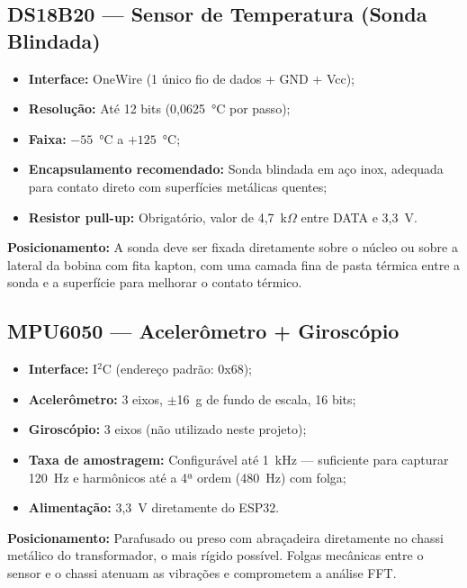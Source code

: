 \documentclass[12pt, a4paper]{article}
\begin{document}
\subsection{DS18B20 --- Sensor de Temperatura (Sonda Blindada)}

\begin{itemize}[leftmargin=2cm]
    \item \textbf{Interface:} OneWire (1 único fio de dados + GND + Vcc);
    \item \textbf{Resolução:} Até 12 bits (0,0625~°C por passo);
    \item \textbf{Faixa:} $-55$~°C a $+125$~°C;
    \item \textbf{Encapsulamento recomendado:} Sonda blindada em aço inox, adequada para contato direto com superfícies metálicas quentes;
    \item \textbf{Resistor pull-up:} Obrigatório, valor de 4,7~k$\Omega$ entre DATA e 3,3~V.
\end{itemize}

\textbf{Posicionamento:} A sonda deve ser fixada diretamente sobre o núcleo ou sobre a lateral da bobina com fita kapton, com uma camada fina de pasta térmica entre a sonda e a superfície para melhorar o contato térmico.

\subsection{MPU6050 --- Acelerômetro + Giroscópio}

\begin{itemize}[leftmargin=2cm]
    \item \textbf{Interface:} I$^2$C (endereço padrão: 0x68);
    \item \textbf{Acelerômetro:} 3 eixos, $\pm$16~g de fundo de escala, 16 bits;
    \item \textbf{Giroscópio:} 3 eixos (não utilizado neste projeto);
    \item \textbf{Taxa de amostragem:} Configurável até 1~kHz --- suficiente para capturar 120~Hz e harmônicos até a 4ª ordem (480~Hz) com folga;
    \item \textbf{Alimentação:} 3,3~V diretamente do ESP32.
\end{itemize}

\textbf{Posicionamento:} Parafusado ou preso com abraçadeira diretamente no chassi metálico do transformador, o mais rígido possível. Folgas mecânicas entre o sensor e o chassi atenuam as vibrações e comprometem a análise FFT.
\end{document}
